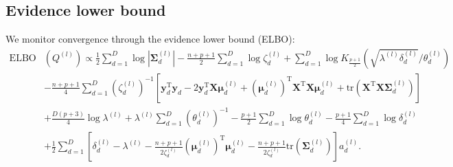 \documentclass[a4paper,hidelinks]{article}\usepackage[]{graphicx}\usepackage[]{color}
\newcommand{\y}{\mathbf{y}}
\newcommand{\X}{\mathbf{X}}
\newcommand{\0}{\bm{0}}
\newcommand{\tr}{^{\text{T}}}
\newcommand{\trace}{\text{tr}}
\renewcommand{\(}{\left(}
\renewcommand{\)}{\right)}
\renewcommand{\[}{\left[}
\renewcommand{\]}{\right]}
\begin{document}
\begin{appendix}
		\subsection{Evidence lower bound}
		We monitor convergence through the evidence lower bound (ELBO):
		\begin{align*}
		\text{ELBO} & (Q^{(l)}) \propto \frac{1}{2} \sum_{d=1}^D \log |\bm{\Sigma}_d^{(l)}| - \frac{n + p + 1}{2} \sum_{d=1}^D \log \zeta_d^{(l)} + \sum_{d=1}^D \log K_{\frac{p+1}{2}}\(\sqrt{\lambda^{(l)} \delta_d^{(l)}}/\theta_d^{(l)}\) \\
		& - \frac{n+p+1}{4} \sum_{d=1}^D (\zeta_d^{(l)})^{-1} \[ \y_d \tr \y_d - 2\y_d \tr \X \bm{\mu}_d^{(l)} + (\bm{\mu}_d^{(l)}) \tr \X \tr \X \bm{\mu}_d^{(l)} + \trace ( \X \tr \X \bm{\Sigma}_d^{(l)})\] \\
		& + \frac{D(p+3)}{4} \log \lambda^{(l)} + \lambda^{(l)} \sum_{d=1}^D (\theta_d^{(l)})^{-1} - \frac{p+1}{2} \sum_{d=1}^D \log \theta_d^{(l)} - \frac{p+1}{4} \sum_{d=1}^D \log \delta_d^{(l)} \\
		& + \frac{1}{2} \sum_{d=1}^D \[ \delta_d^{(l)} - \lambda^{(l)} - \frac{n+p+1}{2\zeta_d^{(l)}} (\bm{\mu}_d^{(l)}) \tr \bm{\mu}_d^{(l)} - \frac{n+p+1}{2\zeta_d^{(l)}} \trace (\bm{\Sigma}_d^{(l)}) \] a_d^{(l)}. 
		\end{align*}
		

\end{appendix}
\end{document}
